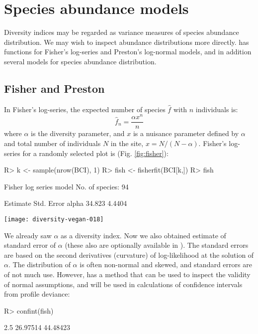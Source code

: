 \documentclass[article,nojss]{jss}
\begin{document}
\section{Species abundance models}

Diversity indices may be regarded as variance measures of species
abundance distribution.  We may wish to inspect abundance
distributions more directly.   has functions for
Fisher's log-series and Preston's log-normal models, and in addition
several models for species abundance distribution.

\subsection{Fisher and Preston}

In Fisher's log-series, the expected number of species $\hat f$ with $n$
individuals is:
\begin{equation}
\hat f_n = \frac{\alpha x^n}{n}
\end{equation}
where $\alpha$ is the diversity parameter, and $x$ is a nuisance
parameter defined by $\alpha$ and total number
of individuals $N$ in the site, $x = N/(N-\alpha)$.  Fisher's
log-series for a randomly selected plot is (Fig. \ref{fig:fisher}):
\begin{Schunk}
\begin{Sinput}
R> k <- sample(nrow(BCI), 1)
R> fish <- fisherfit(BCI[k,])
R> fish
\end{Sinput}
\begin{Soutput}
Fisher log series model
No. of species: 94 

      Estimate Std. Error
alpha   34.823     4.4404
\end{Soutput}
\end{Schunk}
\begin{SCfigure}
\texttt{[image: diversity-vegan-018]}
\caption{Fisher's log-series fitted to one randomly selected site
  (10).}
\label{fig:fisher}
\end{SCfigure}
We already saw $\alpha$ as a diversity index.  Now we also obtained
estimate of standard error of $\alpha$ (these also are optionally
available in ).  The standard errors are based on
the second derivatives (curvature) of log-likelihood at the solution
of $\alpha$.  The distribution of $\alpha$ is often non-normal
and skewed, and standard errors are of not much use.  However,
 has a  method that can be used to
inspect the validity of normal assumptions, and will be used in
calculations of confidence intervals from profile deviance:
\begin{Schunk}
\begin{Sinput}
R> confint(fish)
\end{Sinput}
\begin{Soutput}
   2.5 %   97.5 % 
26.97514 44.48423 
\end{Soutput}
\end{Schunk}
\end{document}
